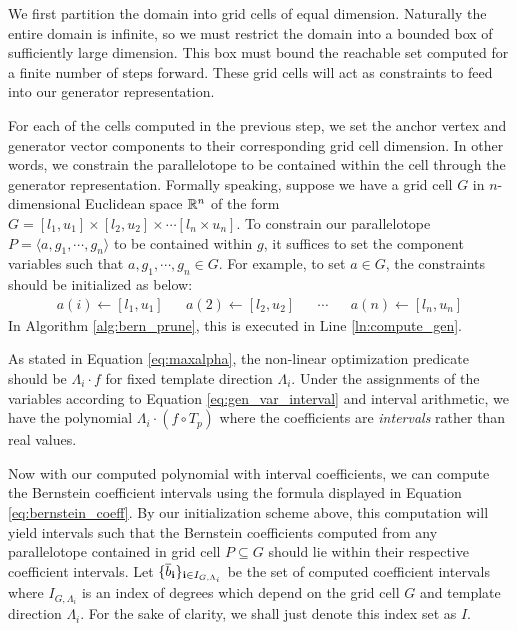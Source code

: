 \begin{enumerate}
 We first partition the domain into grid cells of equal dimension. Naturally the entire domain is infinite, so we must restrict the domain into a bounded box of sufficiently large dimension. This box must bound the reachable set computed for a finite number of steps forward. These grid cells will act as constraints to feed into our generator representation.

 For each of the cells computed in the previous step, we set the anchor vertex and generator vector components to their corresponding grid cell dimension. In other words, we constrain the parallelotope to be contained within the cell through the generator representation. Formally speaking, suppose we have a grid cell $G$ in $n$-dimensional Euclidean space ${\mathbb{R}}^n$ of the form $G = [l_1,u_1] \times [l_2, u_2] \times \cdots [l_n \times u_n]$. To constrain our parallelotope $P = \langle a, g_1, \cdots, g_n\rangle$ to be contained within $g$, it suffices to set the component variables such that $a, g_1, \cdots, g_n \in G$. For example, to set $a \in G$, the constraints should be initialized as below:
\begin{align}
\label{eq:gen_var_interval}
  a(i) \gets [l_1,u_1] & & a(2) \gets [l_2, u_2] & & \cdots & & a(n) \gets [l_n,u_n]
\end{align}
%
%
In Algorithm \ref{alg:bern_prune}, this is executed in Line \ref{ln:compute_gen}.

 As stated in Equation \ref{eq:maxalpha}, the non-linear optimization predicate should be $\Lambda_i\cdot f$ for fixed template direction $\Lambda_i$. Under the assignments of the variables according to Equation \ref{eq:gen_var_interval} and interval arithmetic, we have the polynomial $\Lambda_i\cdot(f \circ T_p)$ where the coefficients are \emph{intervals} rather than real values.

 Now with our computed polynomial with interval coefficients, we can compute the Bernstein coefficient intervals using the formula displayed in Equation \ref{eq:bernstein_coeff}. By our initialization scheme above, this computation will yield intervals such that the Bernstein coefficients computed from any parallelotope contained in grid cell $P \subseteq G$ should lie within their respective coefficient intervals. Let $\{\overline{b}_{{\bf i}}\}_{{\bf i} \in I_{G,\Lambda_i}}$ be the set of computed coefficient intervals where $I_{G,\Lambda_i}$ is an index of degrees which depend on the grid cell $G$ and template direction $\Lambda_i$. For the sake of clarity, we shall just denote this index set as $I$.


\end{enumerate}
